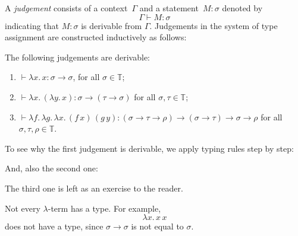 \begin{definition}
  A \emph{judgement} consists of a context~$\Gamma$ and a statement~$M:\sigma$ denoted by
      \[
        \Gamma \vdash M : \sigma
      \]
  indicating that $M : \sigma$ is derivable from $\Gamma$. Judgements in the
  system of type assignment are constructed inductively as follows:
  \begin{multicols}{2} 
  \begin{prooftree}
  \end{prooftree}
  \begin{prooftree}
  \end{prooftree}
  \begin{prooftree}
  \end{prooftree}
  \end{multicols}
\end{definition}

\begin{example}
  The following judgements are derivable:
  \begin{enumerate}
    \item $\vdash \lambda x.\, x : \sigma \to \sigma$, for all $\sigma \in
      \mathbb{T}$;
    \item $ \vdash \lambda x.\, (\lambda y.\, x) : \sigma \to (\tau \to \sigma)$
      for all $\sigma, \tau\in\mathbb{T}$;
    \item $\vdash \lambda f.\,\lambda g.\, \lambda x.\, (f\,x)\, (g\,y) 
      : (\sigma \to \tau \to \rho) \to (\sigma\to\tau) \to \sigma\to\rho$
      for all $\sigma, \tau, \rho \in \mathbb{T}$.
  \end{enumerate}
  To see why the first judgement is derivable, we apply typing rules
  step by step:
  \begin{prooftree}
  \end{prooftree}
  And, also the second one:
  \begin{prooftree}
  \end{prooftree}
  The third one is left as an exercise to the reader.
\end{example}
\begin{example}
  Not every $\lambda$-term has a type. For example,
  \[
    \lambda x.\, x\,x
  \]
  does not have a type, since $\sigma \to \sigma$ is not equal to $\sigma$.
\end{example}


